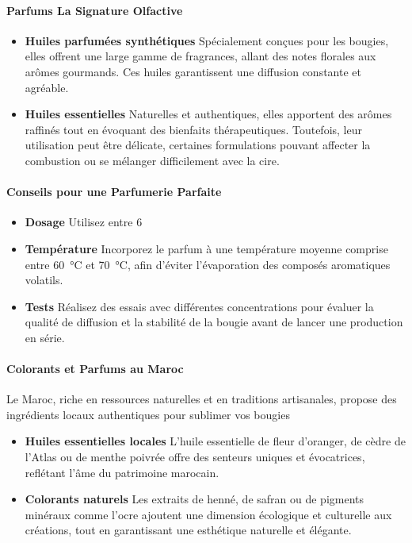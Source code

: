 \documentclass[11pt,fleqn,onecolumn,oneside]{book}
\begin{document}
\paragraph{Parfums La Signature Olfactive}

\begin{itemize}
    \item \textbf{Huiles parfumées synthétiques} Spécialement conçues pour les bougies, elles offrent une large gamme de fragrances, allant des notes florales aux arômes gourmands. Ces huiles garantissent une diffusion constante et agréable.
    \item \textbf{Huiles essentielles} Naturelles et authentiques, elles apportent des arômes raffinés tout en évoquant des bienfaits thérapeutiques. Toutefois, leur utilisation peut être délicate, certaines formulations pouvant affecter la combustion ou se mélanger difficilement avec la cire.
\end{itemize}

\paragraph{Conseils pour une Parfumerie Parfaite}
\begin{itemize}
    \item \textbf{Dosage} Utilisez entre 6 %
    \item \textbf{Température} Incorporez le parfum à une température moyenne comprise entre \SI{60}{\degreeCelsius} et \SI{70}{\degreeCelsius}, afin d’éviter l’évaporation des composés aromatiques volatils.
    \item \textbf{Tests} Réalisez des essais avec différentes concentrations pour évaluer la qualité de diffusion et la stabilité de la bougie avant de lancer une production en série.
\end{itemize}

\paragraph{Colorants et Parfums au Maroc}

Le Maroc, riche en ressources naturelles et en traditions artisanales, propose des ingrédients locaux authentiques pour sublimer vos bougies
\begin{itemize}
    \item \textbf{Huiles essentielles locales} L’huile essentielle de fleur d’oranger, de cèdre de l’Atlas ou de menthe poivrée offre des senteurs uniques et évocatrices, reflétant l’âme du patrimoine marocain.
    \item \textbf{Colorants naturels} Les extraits de henné, de safran ou de pigments minéraux comme l’ocre ajoutent une dimension écologique et culturelle aux créations, tout en garantissant une esthétique naturelle et élégante.
\end{itemize}
\end{document}
